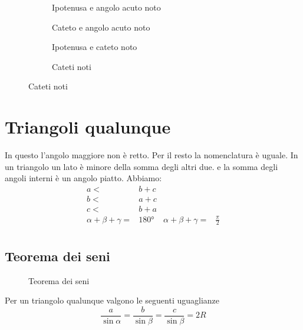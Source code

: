\begin{figure}
	\begin{subfigure}[b]{.5\linewidth}
		\centering

	\caption{Ipotenusa e angolo acuto noto}
	\label{fig:risTriangRett_1}
	\end{subfigure}%
	\begin{subfigure}[b]{.5\linewidth}
		\centering
		
		\caption{Cateto e angolo acuto noto}
		\label{fig:risTriangRett_2}
	\end{subfigure}
	\begin{subfigure}[b]{.5\linewidth}
		\centering
	
	\caption{Ipotenusa e cateto noto}
	\label{fig:risTriangRett_3}
	\end{subfigure}%
	\begin{subfigure}[b]{.5\linewidth}
		\centering
		
		\caption{Cateti noti}
		\label{fig:risTriangRett_4}
	\end{subfigure}
	\label{fig:RisoluzioneTriangoliRettangoli}
\end{figure}
\section{Triangoli qualunque}
In questo l'angolo maggiore non è  retto. Per il resto la nomenclatura è uguale. In un triangolo un lato è minore della somma degli altri due. e la somma degli angoli interni è un angolo piatto. Abbiamo:
 \begin{align*}
a<&b+c\\
b<&a+c\\
c<&b+a\\
\alpha+\beta+\gamma=&\ang{180}&\alpha+\beta+\gamma=&\frac{\pi}{2}\\
\end{align*}
\subsection{Teorema dei seni}
\begin{figure}
	\centering
	
	\caption{Teorema dei seni}
	\label{fig:TeoremDeiSeni}
\end{figure}
Per un triangolo qualunque valgono le seguenti uguaglianze\[\dfrac{a}{\sin\alpha}=\dfrac{b}{\sin\beta}=\dfrac{c}{\sin\beta}=2R \]

